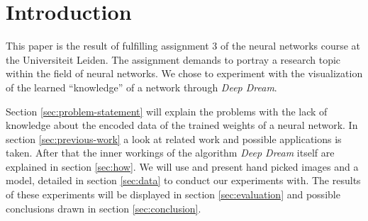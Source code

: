\section{Introduction}
This paper is the result of fulfilling assignment 3 of the neural networks course at the Universiteit Leiden.
The assignment demands to portray a research topic within the field of neural networks.
We chose to experiment with the visualization of the learned \enquote{knowledge} of a network through \emph{Deep Dream}.

Section \ref{sec:problem-statement} will explain the problems with the lack of knowledge about the encoded data of the trained weights of a neural network.
In section \ref{sec:previous-work} a look at related work and possible applications is taken.
After that the inner workings of the algorithm \textit{Deep Dream} itself are explained in section \ref{sec:how}.
We will use and present hand picked images and a model, detailed in section \ref{sec:data} to conduct our experiments with.
The results of these experiments will be displayed in section \ref{sec:evaluation} and possible conclusions drawn in section \ref{sec:conclusion}.




